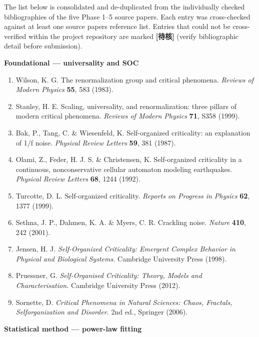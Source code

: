 \documentclass[
  11pt]{article}
\providecommand{\tightlist}{%
  \setlength{\itemsep}{0pt}\setlength{\parskip}{0pt}}
\begin{document}
The list below is consolidated and de-duplicated from the individually
checked bibliographies of the five Phase 1--5 source papers. Each entry
was cross-checked against at least one source paper\textquotesingle s
reference list. Entries that could not be cross-verified within the
project repository are marked \textbf{{[}待核{]}} (verify bibliographic
detail before submission).

\textbf{Foundational --- universality and SOC}

\begin{enumerate}
\def\labelenumi{\arabic{enumi}.}
\tightlist
\item
  Wilson, K. G. The renormalization group and critical phenomena.
  \emph{Reviews of Modern Physics} \textbf{55}, 583 (1983).
\item
  Stanley, H. E. Scaling, universality, and renormalization: three
  pillars of modern critical phenomena. \emph{Reviews of Modern Physics}
  \textbf{71}, S358 (1999).
\item
  Bak, P., Tang, C. \& Wiesenfeld, K. Self-organized criticality: an
  explanation of 1/f noise. \emph{Physical Review Letters} \textbf{59},
  381 (1987).
\item
  Olami, Z., Feder, H. J. S. \& Christensen, K. Self-organized
  criticality in a continuous, nonconservative cellular automaton
  modeling earthquakes. \emph{Physical Review Letters} \textbf{68}, 1244
  (1992).
\item
  Turcotte, D. L. Self-organized criticality. \emph{Reports on Progress
  in Physics} \textbf{62}, 1377 (1999).
\item
  Sethna, J. P., Dahmen, K. A. \& Myers, C. R. Crackling noise.
  \emph{Nature} \textbf{410}, 242 (2001).
\item
  Jensen, H. J. \emph{Self-Organized Criticality: Emergent Complex
  Behavior in Physical and Biological Systems.} Cambridge University
  Press (1998).
\item
  Pruessner, G. \emph{Self-Organised Criticality: Theory, Models and
  Characterisation.} Cambridge University Press (2012).
\item
  Sornette, D. \emph{Critical Phenomena in Natural Sciences: Chaos,
  Fractals, Selforganization and Disorder.} 2nd ed., Springer (2006).
\end{enumerate}

\textbf{Statistical method --- power-law fitting}
\end{document}
